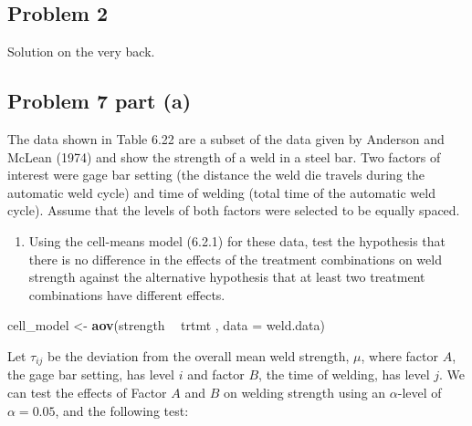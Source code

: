 \documentclass[12pt,]{article}
\newenvironment{Shaded}{\begin{snugshade}}{\end{snugshade}}
\newcommand{\KeywordTok}[1]{\textcolor[rgb]{0.13,0.29,0.53}{\textbf{#1}}}
\newcommand{\DataTypeTok}[1]{\textcolor[rgb]{0.13,0.29,0.53}{#1}}
\newcommand{\StringTok}[1]{\textcolor[rgb]{0.31,0.60,0.02}{#1}}
\newcommand{\OtherTok}[1]{\textcolor[rgb]{0.56,0.35,0.01}{#1}}
\newcommand{\OperatorTok}[1]{\textcolor[rgb]{0.81,0.36,0.00}{\textbf{#1}}}
\newcommand{\NormalTok}[1]{#1}
\providecommand{\tightlist}{%
  \setlength{\itemsep}{0pt}\setlength{\parskip}{0pt}}
\begin{document}
\subsection{Problem 2}\label{problem-2}

Solution on the very back.

\subsection{Problem 7 part (a)}\label{problem-7-part-a}

The data shown in Table 6.22 are a subset of the data given by Anderson
and McLean (1974) and show the strength of a weld in a steel bar. Two
factors of interest were gage bar setting (the distance the weld die
travels during the automatic weld cycle) and time of welding (total time
of the automatic weld cycle). Assume that the levels of both factors
were selected to be equally spaced.

\begin{Shaded}
\end{Shaded}

\begin{enumerate}
\def\labelenumi{(\alph{enumi})}
\tightlist
\item
  Using the cell-means model (6.2.1) for these data, test the hypothesis
  that there is no difference in the effects of the treatment
  combinations on weld strength against the alternative hypothesis that
  at least two treatment combinations have different effects.
\end{enumerate}

\begin{Shaded}
\begin{Highlighting}[]
\NormalTok{cell_model <-}\StringTok{ }\KeywordTok{aov}\NormalTok{(strength }\OperatorTok{~}\StringTok{ }\NormalTok{trtmt , }\DataTypeTok{data =}\NormalTok{ weld.data)}
\end{Highlighting}
\end{Shaded}

Let \(\tau_{ij}\) be the deviation from the overall mean weld strength,
\(\mu\), where factor \(A\), the gage bar setting, has level \(i\) and
factor \(B\), the time of welding, has level \(j\). We can test the
effects of Factor \(A\) and \(B\) on welding strength using an
\(\alpha\)-level of \(\alpha = 0.05\), and the following test:
\end{document}
